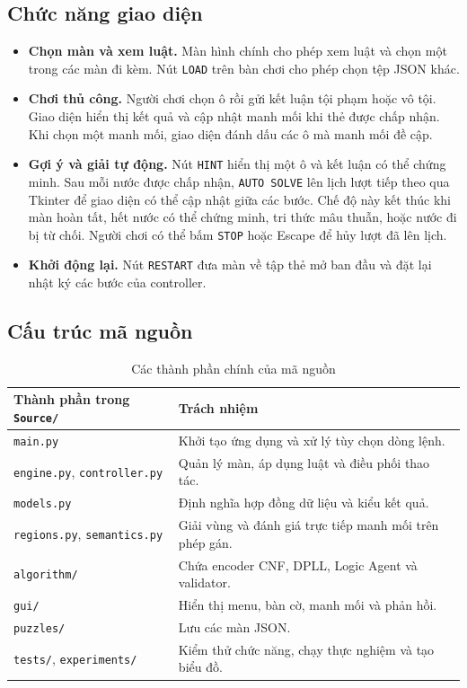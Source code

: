 \subsection{Chức năng giao diện}
\begin{itemize}
    \item \textbf{Chọn màn và xem luật.} Màn hình chính cho phép xem
    luật và chọn một trong các màn đi kèm. Nút \texttt{LOAD} trên bàn
    chơi cho phép chọn tệp JSON khác.
    \item \textbf{Chơi thủ công.} Người chơi chọn ô rồi gửi kết luận
    tội phạm hoặc vô tội. Giao diện hiển thị kết quả và cập nhật
    manh mối khi thẻ được chấp nhận. Khi chọn một manh mối, giao diện
    đánh dấu các ô mà manh mối đề cập.
    \item \textbf{Gợi ý và giải tự động.} Nút \texttt{HINT} hiển thị
    một ô và kết luận có thể chứng minh. Sau mỗi nước được chấp nhận,
    \texttt{AUTO SOLVE} lên lịch lượt tiếp theo qua Tkinter để giao
    diện có thể cập nhật giữa các bước. Chế độ này kết thúc khi màn
    hoàn tất, hết nước có thể chứng minh, tri thức mâu thuẫn, hoặc nước
    đi bị từ chối. Người chơi có thể bấm \texttt{STOP} hoặc Escape
    để hủy lượt đã lên lịch.
    \item \textbf{Khởi động lại.} Nút \texttt{RESTART} đưa màn về
    tập thẻ mở ban đầu và đặt lại nhật ký các bước của controller.
\end{itemize}

\subsection{Cấu trúc mã nguồn}
\begin{table}[htbp]
\centering
\small
\begin{tabularx}{\linewidth}{lY}
\toprule
Thành phần trong \texttt{Source/} & Trách nhiệm \\
\midrule
\texttt{main.py} & Khởi tạo ứng dụng và xử lý tùy chọn dòng lệnh. \\
\texttt{engine.py}, \texttt{controller.py} & Quản lý màn, áp dụng luật và điều phối thao tác. \\
\texttt{models.py} & Định nghĩa hợp đồng dữ liệu và kiểu kết quả. \\
\texttt{regions.py}, \texttt{semantics.py} & Giải vùng và đánh giá trực tiếp manh mối trên phép gán. \\
\texttt{algorithm/} & Chứa encoder CNF, DPLL, Logic Agent và validator. \\
\texttt{gui/} & Hiển thị menu, bàn cờ, manh mối và phản hồi. \\
\texttt{puzzles/} & Lưu các màn JSON. \\
\texttt{tests/}, \texttt{experiments/} & Kiểm thử chức năng, chạy thực nghiệm và tạo biểu đồ. \\
\bottomrule
\end{tabularx}
\caption{Các thành phần chính của mã nguồn}
\end{table}

